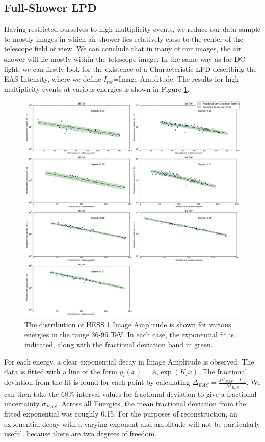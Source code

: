 \documentclass[11pt]{article}
\begin{document}
\subsection{Full-Shower LPD}
Having restricted ourselves to high-multiplicity events, we reduce our data sample to mostly images in which air shower lies relatively close to the center of the telescope field of view. We can conclude that in many of our images, the air shower will lie mostly within the telescope image. In the same way as for DC light, we can firstly look for the existence of a Characteristic LPD describing the EAS Intensity, where we define $I_{tot}$=Image Amplitude. The results for high-multiplicity events at various energies is shown in Figure \ref{fig:fullshowerlpd}.

\begin{figure}
\begin{center}
\includegraphics[width=\textwidth]{corsikafullshowerlpd}
\caption{The distribution of HESS 1 Image Amplitude is shown for various energies in the range 36-96 TeV. In each case, the exponential fit is indicated, along with the fractional deviation band in green.}
\label{fig:fullshowerlpd}
\end{center}
\end{figure}

For each energy, a clear exponential decay in Image Amplitude is observed. The data is fitted with a line of the form $y_{i} (x) =A_{i} \exp (K_{i} x)$. The fractional deviation from the fit is found for each point by calculating $\Delta_{EAS} = \frac{fit_{EAS} - I_{tot}}{fit_{EAS}}$. We can then take the 68\% interval values for fractional deviation to give a fractional uncertainty $\sigma_{EAS}$. Across all Energies, the mean fractional deviation from the fitted exponential was roughly 0.15. For the purposes of reconstruction, an exponential decay with a varying exponent and amplitude will not be particularly useful, because there are two degrees of freedom.
\end{document}
